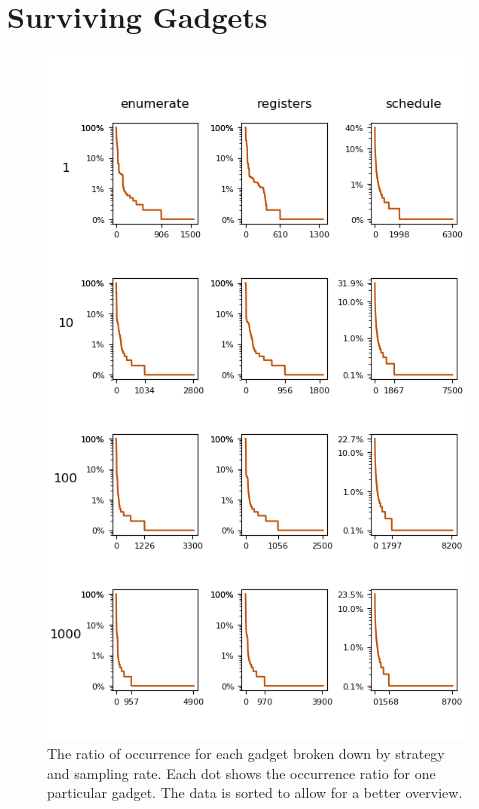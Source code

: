 \section{Surviving Gadgets}

\begin{figure}[htp]
	\centering
	\includegraphics[width=\textwidth,height=\textheight]{results/figures/gadgets}
	\caption{The ratio of occurrence for each gadget broken down by strategy and sampling rate.
Each dot shows the occurrence ratio for one particular gadget. The data is sorted to allow
	for a better overview.}
	\label{fig:gadgets}
\end{figure}

